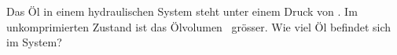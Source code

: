 Das Öl in einem hydraulischen System steht unter einem Druck von \poeO. Im unkomprimierten Zustand ist das Ölvolumen \dVoO\ grösser. Wie viel Öl befindet sich im System?
